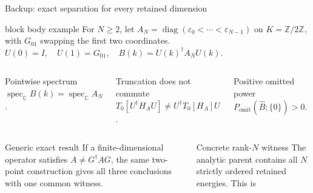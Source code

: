 \documentclass[aspectratio=169,10pt]{beamer}
\begin{document}
\begin{frame}{Backup: exact separation for every retained dimension}
  \scriptsize
  \begin{beamercolorbox}[rounded=true,sep=0.38em,wd=\textwidth]{block body example}
    \centering
    For $N\ge2$, let $A_N=\operatorname{diag}(\varepsilon_0<\cdots<\varepsilon_{N-1})$
    on $K=\mathbb Z/2\mathbb Z$, with $G_{01}$ swapping the first two coordinates.\\[0.18em]
    $U(0)=I,\quad U(1)=G_{01},\quad B(k)=U(k)^\dagger A_NU(k)$.
  \end{beamercolorbox}
  \vspace{0.15em}
  \begin{columns}[T,onlytextwidth]
      \begin{block}{Pointwise spectrum}
        \centering\vspace{0.22em}
        $\operatorname{spec}_{\mathbb C}B(k)=\operatorname{spec}_{\mathbb C}A_N$.
        \vspace{0.22em}
      \end{block}
      \begin{alertblock}{Truncation does not commute}
        \centering\vspace{0.22em}
        $T_0[U^\dagger H_AU]\ne U^\dagger T_0[H_A]U$.
        \vspace{0.22em}
      \end{alertblock}
      \begin{exampleblock}{Positive omitted power}
        \centering\vspace{0.22em}
        $P_{\mathrm{omit}}(\widehat B;\{0\})>0$.
        \vspace{0.22em}
      \end{exampleblock}
  \end{columns}
  \vspace{0.05em}
  \begin{columns}[T,onlytextwidth]
      \begin{block}{Generic exact result}
        If a finite-dimensional operator satisfies $A\ne G^\dagger AG$, the same
        two-point construction gives all three conclusions with one common witness.
      \end{block}
      \begin{block}{Concrete rank-$N$ witness}
        The analytic parent contains all $N$ strictly ordered retained energies. This is

\end{block}
\end{columns}
\end{frame}
\end{document}
